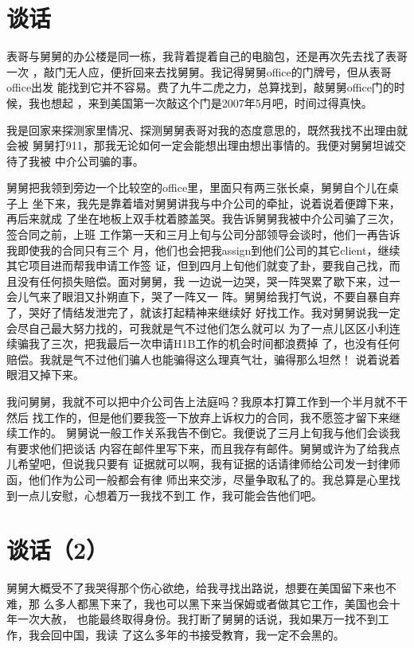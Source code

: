 \documentclass[12pt]{book}
\begin{document}
\section{谈话}
\label{sec-9-73}

表哥与舅舅的办公楼是同一栋，我背着提着自己的电脑包，还是再次先去找了表哥一次
，敲门无人应，便折回来去找舅舅。我记得舅舅office的门牌号，但从表哥office出发
能找到它并不容易。费了九牛二虎之力，总算找到，敲舅舅office门的时候，我也想起
，来到美国第一次敲这个门是2007年5月吧，时间过得真快。

我是回家来探测家里情况、探测舅舅表哥对我的态度意思的，既然我找不出理由就会被
舅舅打911，那我无论如何一定会能想出理由想出事情的。我便对舅舅坦诚交待了我被
中介公司骗的事。

舅舅把我领到旁边一个比较空的office里，里面只有两三张长桌，舅舅自个儿在桌子上
坐下来，我先是靠着墙对舅舅讲我与中介公司的牵扯，说着说着便蹲下来，再后来就成
了坐在地板上双手枕着膝盖哭。我告诉舅舅我被中介公司骗了三次，签合同之前，上班
工作第一天和三月上旬与公司分部领导会谈时，他们一再告诉我即使我的合同只有三个
月，他们也会把我assign到他们公司的其它client，继续其它项目进而帮我申请工作签
证，但到四月上旬他们就变了卦，要我自己找，而且没有任何损失赔偿。面对舅舅，我
一边说一边哭，哭一阵哭累了歇下来，过一会儿气来了眼泪又扑朔直下，哭了一阵又一
阵。舅舅给我打气说，不要自暴自弃了，哭好了情结发泄完了，就该打起精神来继续好
好找工作。我对舅舅说我一定会尽自己最大努力找的，可我就是气不过他们怎么就可以
为了一点儿区区小利连续骗我了三次，把我最后一次申请H1B工作的机会时间都浪费掉
了，也没有任何赔偿。我就是气不过他们骗人也能骗得这么理真气壮，骗得那么坦然！
说着说着眼泪又掉下来。

我问舅舅，我就不可以把中介公司告上法庭吗？我原本打算工作到一个半月就不干然后
找工作的，但是他们要我签一下放弃上诉权力的合同，我不愿签才留下来继续工作的。
舅舅说一般工作关系我告不倒它。我便说了三月上旬我与他们会谈我有要求他们把谈话
内容在邮件里写下来，而且我存有邮件。舅舅或许为了给我点儿希望吧，但说我只要有
证据就可以啊，我有证据的话请律师给公司发一封律师函，他们作为公司一般都会有律
师出来交涉，尽量争取私了的。我总算是心里找到一点儿安慰，心想着万一我找不到工
作，我可能会告他们吧。
\section{谈话（2）}
\label{sec-9-74}

舅舅大概受不了我哭得那个伤心欲绝，给我寻找出路说，想要在美国留下来也不难，那
么多人都黑下来了，我也可以黑下来当保姆或者做其它工作，美国也会十年一次大赦，
也能最终取得身份。我打断了舅舅的话说，我如果万一找不到工作，我会回中国，我读
了这么多年的书接受教育，我一定不会黑的。
\end{document}
